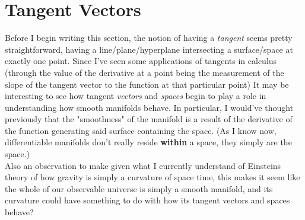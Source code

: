 \documentclass[12pt]{book}
\theoremstyle{definition}
\begin{document}
\chapter{Tangent Vectors}
Before I begin writing this section, the notion of having a \textit{tangent} seems pretty straightforward, having a line/plane/hyperplane intersecting a surface/space at exactly one point. Since I've seen some applications of tangents in calculus (through the value of the derivative at a point being the measurement of the slope of the tangent vector to the function at that particular point) It may be interesting to see how tangent \textit{vectors} and \textit{spaces} begin to play a role in understanding how smooth manifolds behave. In particular, I would've thought previously that the "smoothness" of the manifold is a result of the derivative of the function generating said surface containing the space. (As I know now, differentiable manifolds don't really reside \textbf{within} a space, they simply are the space.)\\
Also an observation to make given what I currently understand of Einsteins theory of how gravity is simply a curvature of space time, this makes it seem like the whole of our observable universe is simply a smooth manifold, and its curvature could have something to do with how its tangent vectors and spaces behave?\newpage
\end{document}
